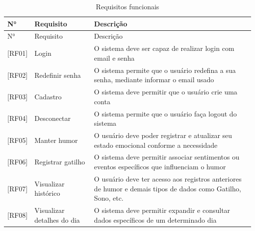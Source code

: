 \newpage

\begin{longtable}{| p{} | p{} | p{} |}
    \caption{Requisitos funcionais}
    \label{tab:requisitos_funcionais} \\
        \hline
        N° & Requisito & Descrição \\
        \hline
        \endfirsthead
        \hline
        N° & Requisito & Descrição \\
        \hline
        \endhead
        \endfoot

        [RF01] &
        Login &
        O sistema deve ser capaz de realizar login com email e senha \\

        \hline

        [RF02] &
        Redefinir senha &

        O sistema permite que o usuário redefina a sua senha, mediante informar
        o email usado \\

        \hline

        [RF03] &
        Cadastro &
        O sistema deve permitir que o usuário crie uma conta \\

        \hline

        [RF04] &
        Desconectar &
        O sistema permite que o usuário faça logout do sistema \\

        \hline

        [RF05] &
        Manter humor &
        O usuário deve poder registrar e atualizar seu estado emocional
        conforme a necessidade \\

        \hline

        [RF06] &
        Registrar gatilho &
        O sistema deve permitir associar sentimentos ou eventos específicos que
        influenciam o humor \\

        \hline

        [RF07] &
        Visualizar histórico &
        O usuário deve ter acesso aos registros anteriores de humor e demais
        tipos de dados como Gatilho, Sono, etc. \\

        \hline

        [RF08] &
        Visualizar detalhes do dia &
        O sistema deve permitir expandir e consultar dados específicos de um
        determinado dia \\


\end{longtable}
